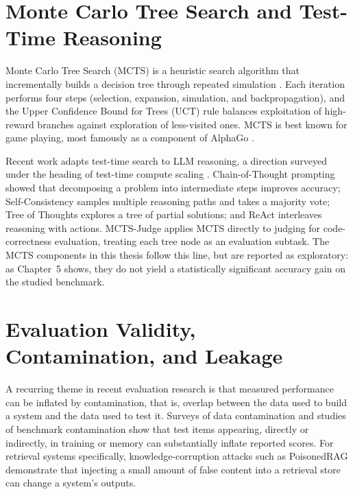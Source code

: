 \documentclass[14pt,a4paper]{extreport}
\begin{document}
\section{Monte Carlo Tree Search and Test-Time Reasoning}

Monte Carlo Tree Search (MCTS) is a heuristic search algorithm that incrementally builds a decision tree through repeated simulation \cite{uct2006, mcts_survey2012}. Each iteration performs four steps (selection, expansion, simulation, and backpropagation), and the Upper Confidence Bound for Trees (UCT) rule balances exploitation of high-reward branches against exploration of less-visited ones. MCTS is best known for game playing, most famously as a component of AlphaGo \cite{alpha_go2016}.

Recent work adapts test-time search to LLM reasoning, a direction surveyed under the heading of test-time compute scaling \cite{test_time_scaling2024}. Chain-of-Thought prompting \cite{chain_of_thought2022} showed that decomposing a problem into intermediate steps improves accuracy; Self-Consistency \cite{self_consistency2023} samples multiple reasoning paths and takes a majority vote; Tree of Thoughts \cite{tree_of_thoughts2023} explores a tree of partial solutions; and ReAct \cite{react2023} interleaves reasoning with actions. MCTS-Judge \cite{mcts_judge2025} applies MCTS directly to judging for code-correctness evaluation, treating each tree node as an evaluation subtask. The MCTS components in this thesis follow this line, but are reported as exploratory: as Chapter~5 shows, they do not yield a statistically significant accuracy gain on the studied benchmark.

\section{Evaluation Validity, Contamination, and Leakage}

A recurring theme in recent evaluation research is that measured performance can be inflated by contamination, that is, overlap between the data used to build a system and the data used to test it. Surveys of data contamination \cite{data_contamination2024} and studies of benchmark contamination \cite{benchmark_contamination2024, eval_leakage2024} show that test items appearing, directly or indirectly, in training or memory can substantially inflate reported scores. For retrieval systems specifically, knowledge-corruption attacks such as PoisonedRAG \cite{rag_poisoning2024} demonstrate that injecting a small amount of false content into a retrieval store can change a system's outputs.
\end{document}
